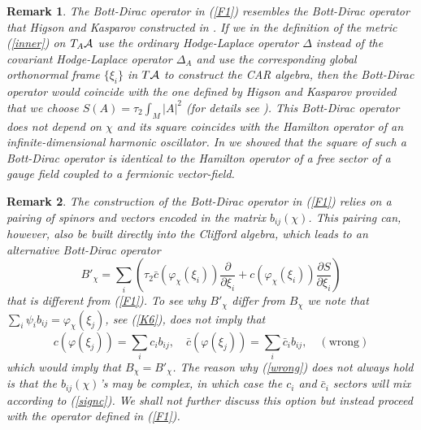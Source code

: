 \documentclass[12pt]{article}
\def\ca{{\cal A}}
\newcommand{\pa}{\partial}
\newtheorem{remark}{Remark}
\begin{document}
\begin{remark}
The Bott-Dirac operator in (\ref{F1}) resembles the Bott-Dirac operator that Higson and Kasparov constructed in \cite{Higson}. If we in the definition of the metric (\ref{inner}) on $T_A\ca$ use the ordinary Hodge-Laplace operator $\Delta$ instead of the covariant Hodge-Laplace operator $\Delta_A$ and use the corresponding global orthonormal frame $\{\xi_i\}$ in $T\ca$ to construct the CAR algebra, then the Bott-Dirac operator would coincide with the one defined by Higson and Kasparov provided that we choose $S(A) =\tau_2 \int_M \vert A\vert ^2$ (for details see \cite{Aastrup:2017atr}). This Bott-Dirac operator does not depend on $\chi$ and its square coincides with the Hamilton operator of an infinite-dimensional harmonic oscillator. In \cite{Aastrup:2017atr} we showed that the square of such a Bott-Dirac operator is identical to the Hamilton operator of a free sector of a gauge field coupled to a fermionic vector-field.
\end{remark}














\begin{remark}


The construction of the Bott-Dirac operator in (\ref{F1}) relies on a pairing of spinors and vectors encoded in the matrix $b_{ij}(\chi)$. This pairing can, however, also be built directly into the Clifford algebra, which leads to an alternative Bott-Dirac operator 
$$
B'_\chi = \sum_i \left( \tau_2 \bar{c} (\varphi_\chi(\xi_i))\frac{\pa}{\pa \xi_i}   + {c}(\varphi_\chi(\xi_i)) \frac{\pa S}{\pa \xi_i} \right)
$$
 that is different from (\ref{F1}).
To see why $B'_\chi$ differ from $B_\chi$ we note that
$
\sum_i \psi_i b_{ij} = \varphi_\chi(\xi_j)
$, see (\ref{K6}),
does not imply that
\begin{equation}
c(\varphi(\xi_j)) = \sum_i c_i b_{ij}, \quad \bar{c}(\varphi(\xi_j)) = \sum_i \bar{c}_i b_{ij}, \quad (\mbox{wrong})
\label{wrong}
\end{equation}
which would imply that $B_\chi=B'_\chi$. The reason why (\ref{wrong}) does not always hold is that the $b_{ij}(\chi)$'s may be complex, in which case the $c_i$ and $\bar{c}_i$ sectors will mix according to (\ref{signc}). We shall not further discuss this option but instead proceed with the operator defined in (\ref{F1}).

\end{remark}
\end{document}

